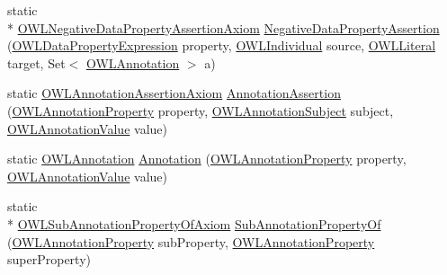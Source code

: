 \begin{DoxyCompactItemize}
\item 
static \\*
\hyperlink{interfaceorg_1_1semanticweb_1_1owlapi_1_1model_1_1_o_w_l_negative_data_property_assertion_axiom}{O\-W\-L\-Negative\-Data\-Property\-Assertion\-Axiom} \hyperlink{classorg_1_1semanticweb_1_1owlapi_1_1apibinding_1_1_o_w_l_functional_syntax_factory_aa974f4c478ede9b9e0c9515bbf8bd37a}{Negative\-Data\-Property\-Assertion} (\hyperlink{interfaceorg_1_1semanticweb_1_1owlapi_1_1model_1_1_o_w_l_data_property_expression}{O\-W\-L\-Data\-Property\-Expression} property, \hyperlink{interfaceorg_1_1semanticweb_1_1owlapi_1_1model_1_1_o_w_l_individual}{O\-W\-L\-Individual} source, \hyperlink{interfaceorg_1_1semanticweb_1_1owlapi_1_1model_1_1_o_w_l_literal}{O\-W\-L\-Literal} target, Set$<$ \hyperlink{interfaceorg_1_1semanticweb_1_1owlapi_1_1model_1_1_o_w_l_annotation}{O\-W\-L\-Annotation} $>$ a)
\item 
static \hyperlink{interfaceorg_1_1semanticweb_1_1owlapi_1_1model_1_1_o_w_l_annotation_assertion_axiom}{O\-W\-L\-Annotation\-Assertion\-Axiom} \hyperlink{classorg_1_1semanticweb_1_1owlapi_1_1apibinding_1_1_o_w_l_functional_syntax_factory_a235c6e1495de99dda2f3e831647699b7}{Annotation\-Assertion} (\hyperlink{interfaceorg_1_1semanticweb_1_1owlapi_1_1model_1_1_o_w_l_annotation_property}{O\-W\-L\-Annotation\-Property} property, \hyperlink{interfaceorg_1_1semanticweb_1_1owlapi_1_1model_1_1_o_w_l_annotation_subject}{O\-W\-L\-Annotation\-Subject} subject, \hyperlink{interfaceorg_1_1semanticweb_1_1owlapi_1_1model_1_1_o_w_l_annotation_value}{O\-W\-L\-Annotation\-Value} value)
\item 
static \hyperlink{interfaceorg_1_1semanticweb_1_1owlapi_1_1model_1_1_o_w_l_annotation}{O\-W\-L\-Annotation} \hyperlink{classorg_1_1semanticweb_1_1owlapi_1_1apibinding_1_1_o_w_l_functional_syntax_factory_ae57ec419e90cb9f030d68bd6d8db578a}{Annotation} (\hyperlink{interfaceorg_1_1semanticweb_1_1owlapi_1_1model_1_1_o_w_l_annotation_property}{O\-W\-L\-Annotation\-Property} property, \hyperlink{interfaceorg_1_1semanticweb_1_1owlapi_1_1model_1_1_o_w_l_annotation_value}{O\-W\-L\-Annotation\-Value} value)
\item 
static \\*
\hyperlink{interfaceorg_1_1semanticweb_1_1owlapi_1_1model_1_1_o_w_l_sub_annotation_property_of_axiom}{O\-W\-L\-Sub\-Annotation\-Property\-Of\-Axiom} \hyperlink{classorg_1_1semanticweb_1_1owlapi_1_1apibinding_1_1_o_w_l_functional_syntax_factory_adcf8ab4369509fcd1578ad2079dd7f70}{Sub\-Annotation\-Property\-Of} (\hyperlink{interfaceorg_1_1semanticweb_1_1owlapi_1_1model_1_1_o_w_l_annotation_property}{O\-W\-L\-Annotation\-Property} sub\-Property, \hyperlink{interfaceorg_1_1semanticweb_1_1owlapi_1_1model_1_1_o_w_l_annotation_property}{O\-W\-L\-Annotation\-Property} super\-Property)

\end{DoxyCompactItemize}
